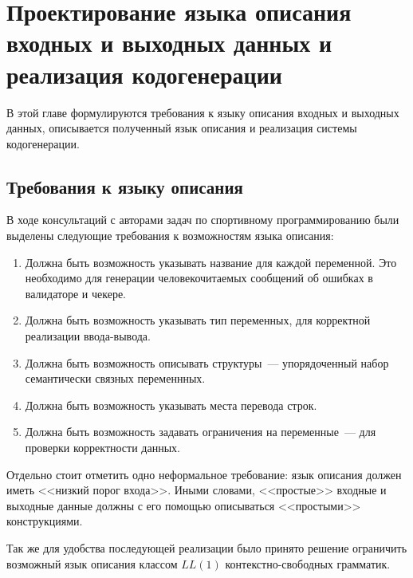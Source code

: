 \documentclass[times,specification,annotation]{style/itmo-student-thesis/itmo-student-thesis}
\begin{document}


\chapter{Проектирование языка описания входных и выходных данных и реализация кодогенерации}

В этой главе формулируются требования к языку описания входных и выходных данных, описывается полученный язык описания и реализация системы кодогенерации.

\section{Требования к языку описания}

В ходе консультаций с авторами задач по спортивному программированию были выделены следующие требования к возможностям языка описания:

\begin{enumerate}
    \item Должна быть возможность указывать название для каждой переменной. Это необходимо для генерации человекочитаемых сообщений об ошибках в валидаторе и чекере.
    \item Должна быть возможность указывать тип переменных, для корректной реализации ввода-вывода.
    \item Должна быть возможность описывать структуры~--- упорядоченный набор семантически связных переменнных.
    \item Должна быть возможность указывать места перевода строк.
    \item Должна быть возможность задавать ограничения на переменные~--- для проверки корректности данных.
\end{enumerate}

Отдельно стоит отметить одно неформальное требование: язык описания должен иметь <<низкий порог входа>>. Иными словами, <<простые>> входные и выходные данные должны с его помощью описываться <<простыми>> конструкциями.

Так же для удобства последующей реализации было принято решение ограничить возможный язык описания классом $LL(1)$ контекстно-свободных грамматик.
\end{document}
